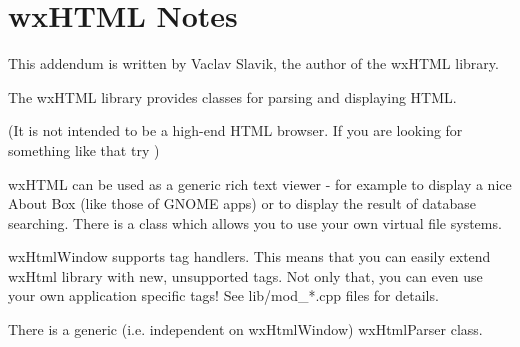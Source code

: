 \chapter{wxHTML Notes}\label{wxhtml}

%
\setfooter{\thepage}{}{}{}{}{\thepage}%

This addendum is written by Vaclav Slavik, the author of the wxHTML library.

The wxHTML library provides classes for parsing and displaying HTML.

(It is not intended to be a high-end HTML browser. If you are looking for
something like that try )

wxHTML can be used as a generic rich text viewer - for example to display 
a nice About Box (like those of GNOME apps) or to display the result of
database searching. There is a  
class which allows you to use your own virtual file systems.

wxHtmlWindow supports tag handlers. This means that you can easily
extend wxHtml library with new, unsupported tags. Not only that,
you can even use your own application specific tags!
See lib/mod\_*.cpp files for details.

There is a generic (i.e. independent on wxHtmlWindow) wxHtmlParser class.









